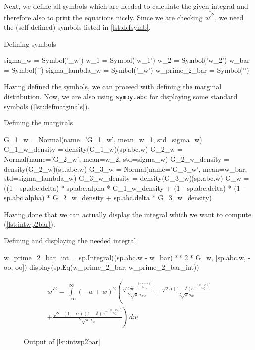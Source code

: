 Next, we define all symbols which are needed to calculate the given integral
and therefore also to print the equations nicely.
Since we are checking $\overline{w'^2}$,
we need the (self-defined) symbols listed in \cref{lst:defsymb}.
\begin{listing}[!ht]
    \caption{Defining symbols}
    \label{lst:defsymb}
    \begin{pythoncode}
        sigma_w = Symbol('\sigma_w')
        w_1 = Symbol('w_1')
        w_2 = Symbol('w_2')
        w_bar = Symbol('')
        sigma_lambda_w = Symbol('\sigma_{\lambda w}')
        w_prime_2_bar = Symbol('')
    \end{pythoncode}
\end{listing}
Having defined the symbols, we can proceed with defining the marginal distribution.
Now, we are also using \texttt{sympy.abc}
for displaying some standard symbols (\cref{lst:defmarginals}).
\begin{listing}[!ht]
    \caption{Defining the marginals}
    \label{lst:defmarginals}
    \begin{pythoncode}
        G_1_w = Normal(name='G_1_w', mean=w_1, std=sigma_w)
        G_1_w_density = density(G_1_w)(sp.abc.w)
        G_2_w = Normal(name='G_2_w', mean=w_2, std=sigma_w)
        G_2_w_density = density(G_2_w)(sp.abc.w)
        G_3_w = Normal(name='G_3_w', mean=w_bar, std=sigma_lambda_w)
        G_3_w_density = density(G_3_w)(sp.abc.w)
        G_w = ((1 - sp.abc.delta) * sp.abc.alpha * G_1_w_density +
               (1 - sp.abc.delta) * (1 - sp.abc.alpha) * G_2_w_density +
               sp.abc.delta * G_3_w_density)
    \end{pythoncode}
\end{listing}
Having done that
we can actually display the integral
which we want to compute (\cref{lst:intwp2bar}).
\begin{listing}[!ht]
    \caption{Defining and displaying the needed integral}
    \label{lst:intwp2bar}
    \begin{pythoncode}
        w_prime_2_bar_int = sp.Integral((sp.abc.w - w_bar) ** 2 * G_w, [sp.abc.w, -oo, oo])
        display(sp.Eq(w_prime_2_bar, w_prime_2_bar_int))
    \end{pythoncode}
\end{listing}
\begin{figure}[!ht]
    \centering
    \caption{Output of \cref{lst:intwp2bar}}
    \label{fig:intwp2barout}
    \begin{align}
        \overline{w'^2}
        = \int\limits_{-\infty}^{\infty}
        \left(- \overline{w} + w\right)^{2}
        \left(\frac{\sqrt{2} \delta e^{- \frac{\left(- \overline{w} + w\right)^{2}}{2 \sigma_{\lambda w}^{2}}}}{2 \sqrt{\pi} \sigma_{\lambda w}}
        + \frac{\sqrt{2} \alpha \left(1 - \delta\right) e^{- \frac{\left(w - w_{1}\right)^{2}}{2 \sigma_{w}^{2}}}}{2 \sqrt{\pi} \sigma_{w}}\right. \nonumber\\
        + \left.\frac{\sqrt{2} \cdot \left(1 - \alpha\right) \left(1 - \delta\right) e^{- \frac{\left(w - w_{2}\right)^{2}}{2 \sigma_{w}^{2}}}}{2 \sqrt{\pi} \sigma_{w}}\right)
        \, dw \nonumber
    \end{align}
\end{figure}
